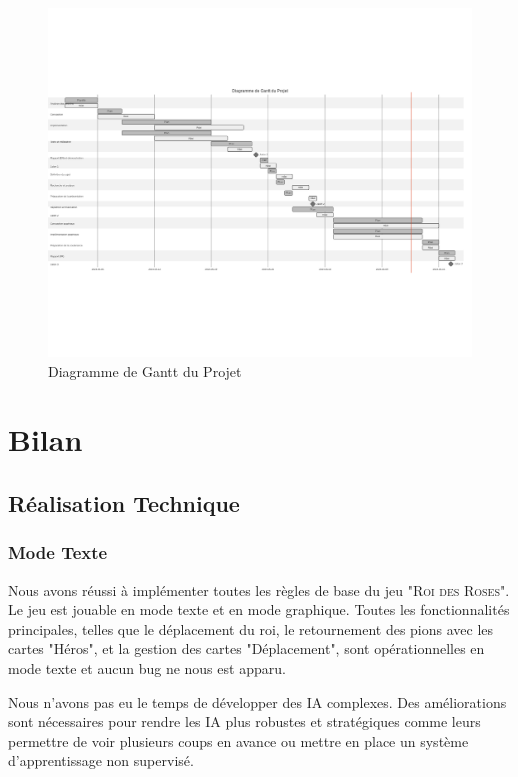 \begin{figure}[h]
    \centering
    \includegraphics[width=\textwidth,angle=0]{./images/mermaid-diagram}
    \caption{Diagramme de Gantt du Projet}
    \label{fig:gantt}
\end{figure}

\chapter{Bilan}

\section{Réalisation Technique}

\subsection*{Mode Texte}

Nous avons réussi à implémenter toutes les règles de base du jeu "\textsc{Roi des Roses}". Le jeu est jouable en mode texte et en mode graphique. Toutes les fonctionnalités principales, telles que le déplacement du roi, le retournement des pions avec les cartes "Héros", et la gestion des cartes "Déplacement", sont opérationnelles en mode texte et aucun bug ne nous est apparu.

Nous n'avons pas eu le temps de développer des IA complexes. Des améliorations sont nécessaires pour rendre les IA plus robustes et stratégiques comme leurs permettre de voir plusieurs coups en avance ou mettre en place un système d'apprentissage non supervisé.

